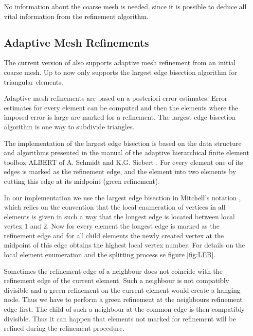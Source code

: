  \noindent No information about the coarse mesh is needed, since it is possible to deduce all vital information from the refinement algorithm.


\subsection{Adaptive Mesh Refinements}
\label{sect:AMR}

 The current version of \LIBNAME also supports adaptive mesh refinement from an initial coarse mesh. Up to now \LIBNAME only supports the largest edge bisection algorithm for triangular elements.

 Adaptive mesh refinements are based on a-posteriori error estimates. Error estimates for every element can be computed and then the elements where the imposed error is large are marked for a refinement. The largest edge bisection algorithm is one way to subdivide triangles.

 The implementation of the largest edge bisection is based on the data structure and algorithms presented in the manual of the adaptive hierarchical finite element toolbox ALBERT of A. Schmidt and K.G. Siebert \cite{ALB00}. For every element one of its edges is marked as the refinement edge, and the element into two elements by cutting this edge at its midpoint (green refinement).

 In our implementation we use the largest edge bisection in Mitchell's notation \cite{MI89}, which relies on the convention that the local enumeration of vertices in all elements is given in such a way that the longest edge is located between local vertex $1$ and $2$. Now for every element the longest edge is marked as the refinement edge and for all child elements the newly created vertex at the midpoint of this edge obtains the highest local vertex number. For details on the local element enumeration and the splitting process se figure \ref{fig:LEB}.

 Sometimes the refinement edge of a neighbour does not coincide with the refinement edge of the current element. Such a neighbour is not compatibly divisible and a green refinement on the current element would create a hanging node. Thus we have to perform a green refinement at the neighbours refinement edge first. The child of such a neighbour at the common edge is then compatibly divisible. Thus it can happen that elements not marked for refinement will be refined during the refinement procedure.

